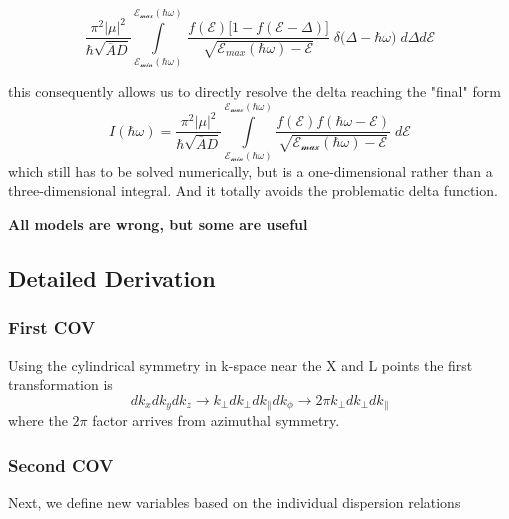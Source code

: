 \begin{equation}
\frac{\pi^{2}|\mu|^{2}}{\hbar \sqrt{ \overline{A}D }}\int\limits_{\mathcal{E_{min}(\hbar \omega)}}^{\mathcal{E_{max}(\hbar \omega)}}  \, \frac{f(\mathcal{E})\Big[ 1-f(\mathcal{E}-\Delta) \Big]}{\sqrt{ \mathcal{E}_{max}(\hbar\omega) -\mathcal{E}}} \; \delta \big( \Delta - \hbar\omega \big) \; d\Delta d\mathcal{E}
\label{eq:quadratic_interband_reduced_integral}
\end{equation}

this consequently allows us to directly resolve the delta reaching the "final" form
\begin{equation}
I(\hbar\omega)= \frac{\pi^{2}|\mu|^{2}}{\hbar \sqrt{ \overline{A}D }}
\int\limits_{\mathcal{E_{min}(\hbar \omega)}}^{\mathcal{E_{max}(\hbar \omega)}} \frac{{f(\mathcal{E})f(\hbar\omega-\mathcal{E})}}{\sqrt{ \mathcal{E_{max}(\hbar\omega)}-\mathcal{E} }} \; d\mathcal{E}
\label{eq:quadratic_interband_final_form}
\end{equation}
which still has to be solved numerically, but is a one-dimensional rather than a three-dimensional integral. And it totally avoids the problematic delta function.

\textbf{All models are wrong, but some are useful}
\subsection{Detailed Derivation}

\subsubsection{First COV}
Using the cylindrical symmetry in k-space near the X and L points the first transformation is
\begin{equation}
dk_{x}dk_{y} dk_{z}\to k_{\perp}dk_{\perp}dk_{\parallel}dk_{\phi}\to 2\pi k_{\perp} dk_{\perp} dk_{\parallel}
\label{eq:quadratic_interband_cov1}
\end{equation}
where the $2\pi$ factor arrives from azimuthal symmetry. 

\subsubsection{Second COV}
Next, we define new variables based on the individual dispersion relations

